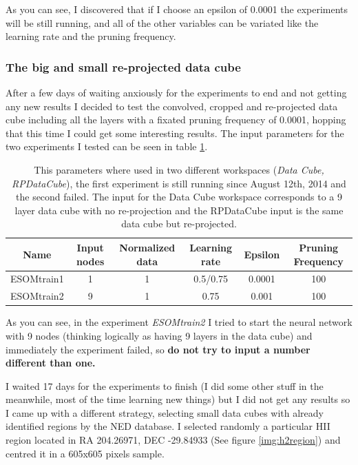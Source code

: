 \documentclass[11pt,fleqn]{book} %
\begin{document}
As you can see, I discovered that if I choose an epsilon of 0.0001 the experiments will be still running, and all of the other variables can be variated like the learning rate and the pruning frequency.

\subsubsection{The big and small re-projected data cube}
After a few days of waiting anxiously for the experiments to end and not getting any new results I decided to test the convolved, cropped and re-projected data cube including all the layers with a fixated pruning frequency of 0.0001, hopping that this time I could get some interesting results. The input parameters for the two experiments I tested can be seen in table \ref{tab:cubeesom}.

\begin{table}[h!]
  \centering
    \begin{tabular}{ c c c c c c }
    \hline\hline
    
    Name & Input nodes & Normalized data & Learning rate & Epsilon & Pruning Frequency\\
    \hline
    
    ESOMtrain1 & 1 & 1 & 0.5/0.75 & 0.0001 & 100\\
    ESOMtrain2 & 9 & 1 & 0.75 & 0.001 & 100\\

    \hline
  \end{tabular}
  \caption{This parameters where used in two different workspaces (\emph{Data Cube, RPDataCube}), the first experiment is still running since August 12th, 2014 and the second failed. The input for the Data Cube workspace corresponds to a 9 layer data cube with no re-projection and the RPDataCube input is the same data cube but re-projected.}
  \label{tab:cubeesom}
\end{table}

As you can see, in the experiment \emph{ESOMtrain2} I tried to start the neural network with 9 nodes (thinking logically as having 9 layers in the data cube) and immediately the experiment failed, so \textbf{do not try to input a number different than one.}

I waited 17 days for the experiments to finish (I did some other stuff in the meanwhile, most of the time learning new things) but I did not get any results so I came up with a different strategy, selecting small data cubes with already identified regions by the NED database. I selected randomly a particular HII region located in RA 204.26971, DEC -29.84933 (See figure \ref{img:h2region}) and centred it in a 605x605 pixels sample.
\end{document}
